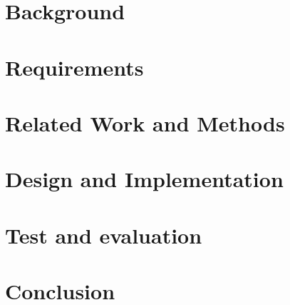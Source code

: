 \documentclass[35pt]{report}
\begin{document}
\chapter{Background}


\chapter{Requirements}


\chapter{Related Work and Methods}


\chapter{Design and Implementation}


\chapter{Test and evaluation}

\chapter{Conclusion}



\end{document}
